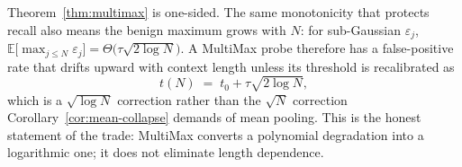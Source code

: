 \begin{remark}
\label{rem:fpr}
Theorem~\ref{thm:multimax} is one-sided. The same monotonicity that protects recall
also means the benign maximum grows with $N$: for sub-Gaussian $\varepsilon_j$,
$\mathbb{E}\big[\max_{j\le N}\varepsilon_j\big]=\Theta\big(\tau\sqrt{2\log N}\big)$.
A MultiMax probe therefore has a false-positive rate that drifts upward with context
length unless its threshold is recalibrated as
\begin{equation}
  t(N)\;=\;t_0+\tau\sqrt{2\log N},
  \label{eq:threshold-drift}
\end{equation}
which is a $\sqrt{\log N}$ correction rather than the $\sqrt{N}$ correction
Corollary~\ref{cor:mean-collapse} demands of mean pooling. This is the honest statement
of the trade: MultiMax converts a polynomial degradation into a logarithmic one; it does
not eliminate length dependence.
\end{remark}

